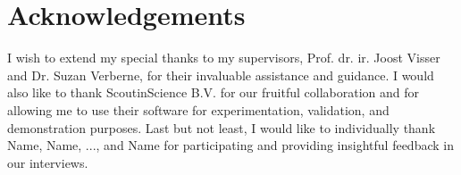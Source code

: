\documentclass{report}
\begin{document}



\tableofcontents

\chapter*{Acknowledgements}
I wish to extend my special thanks to my supervisors, Prof. dr. ir. Joost Visser and Dr. Suzan Verberne, for their invaluable assistance and guidance. I would also like to thank ScoutinScience B.V. for our fruitful collaboration and for allowing me to use their software for experimentation, validation, and demonstration purposes. Last but not least, I would like to individually thank Name, Name, ..., and Name for participating and providing insightful feedback in our interviews.













\end{document}
